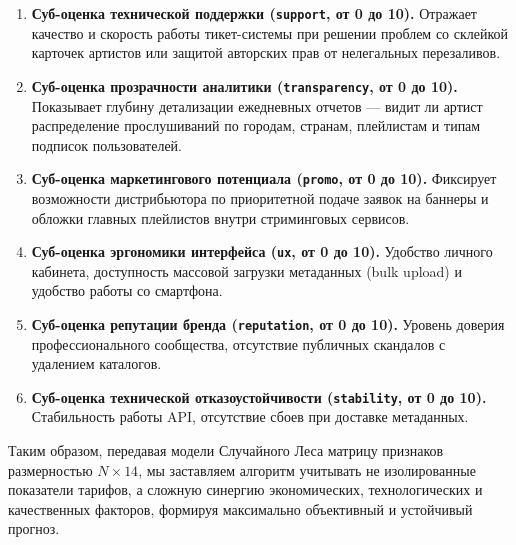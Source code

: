 \documentclass[14pt, a4paper]{extarticle}
\begin{document}
\begin{enumerate}
    \item \textbf{Суб-оценка технической поддержки (\texttt{support}, от 0 до 10).} Отражает качество и скорость работы тикет-системы при решении проблем со склейкой карточек артистов или защитой авторских прав от нелегальных перезаливов.
    \item \textbf{Суб-оценка прозрачности аналитики (\texttt{transparency}, от 0 до 10).} Показывает глубину детализации ежедневных отчетов — видит ли артист распределение прослушиваний по городам, странам, плейлистам и типам подписок пользователей.
    \item \textbf{Суб-оценка маркетингового потенциала (\texttt{promo}, от 0 до 10).} Фиксирует возможности дистрибьютора по приоритетной подаче заявок на баннеры и обложки главных плейлистов внутри стриминговых сервисов.
    \item \textbf{Суб-оценка эргономики интерфейса (\texttt{ux}, от 0 до 10).} Удобство личного кабинета, доступность массовой загрузки метаданных (bulk upload) и удобство работы со смартфона.
    \item \textbf{Суб-оценка репутации бренда (\texttt{reputation}, от 0 до 10).} Уровень доверия профессионального сообщества, отсутствие публичных скандалов с удалением каталогов.
    \item \textbf{Суб-оценка технической отказоустойчивости (\texttt{stability}, от 0 до 10).} Стабильность работы API, отсутствие сбоев при доставке метаданных.
\end{enumerate}

Таким образом, передавая модели Случайного Леса матрицу признаков размерностью $N \times 14$, мы заставляем алгоритм учитывать не изолированные показатели тарифов, а сложную синергию экономических, технологических и качественных факторов, формируя максимально объективный и устойчивый прогноз.
\end{document}
